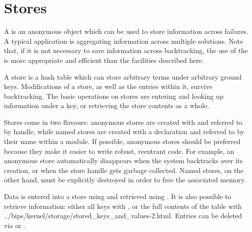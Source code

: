 \section{Stores}


A  is an anonymous object which can be used to store information
across failures.  A typical application is aggregating information across
multiple solutions.  Note that, if it is not necessary to save information
across backtracking, the use of the
is more appropriate and efficient than the facilities described here.

A store is a hash table which can store arbitrary terms under arbitrary
ground keys. Modifications of a store, as well as the entries within it,
survive backtracking.  The basic operations on stores are entering and
looking up information under a key, or retrieving the store contents as
a whole.

Stores come in two flavours:  anonymous stores are created with
and referred to by handle, while named stores are created with a
declaration and referred to by their name within a module.
If possible, anonymous stores should be preferred because they make it
easier to write robust, reentrant code.  For example, an anonymous store
automatically disappears when the system backtracks over its creation,
or when the store handle gets garbage collected.  Named stores, on the
other hand, must be explicitly destroyed in order to free the
associated memory.

Data is entered into a store using
and retrieved using
.
It is also possible to retrieve information: either all keys with
,
or the full contents of the table with
%
{../bips/kernel/storage/stored_keys_and_values-2.html}.
Entries can be deleted via
 or
.

